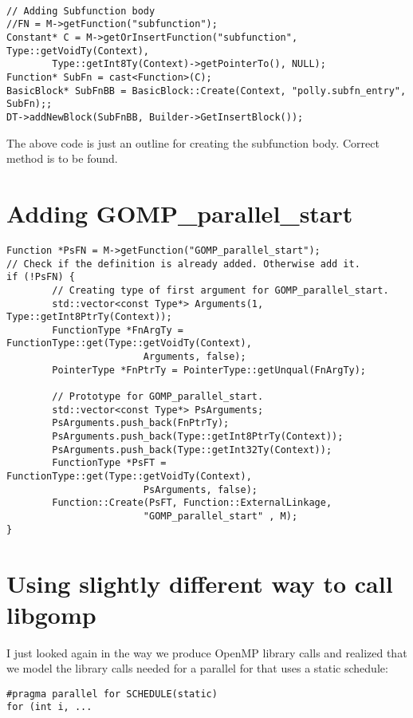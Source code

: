 \documentclass[a4paper,10pt]{article}
\begin{document}
\begin{verbatim}

// Adding Subfunction body
//FN = M->getFunction("subfunction");
Constant* C = M->getOrInsertFunction("subfunction", Type::getVoidTy(Context),
        Type::getInt8Ty(Context)->getPointerTo(), NULL);
Function* SubFn = cast<Function>(C);
BasicBlock* SubFnBB = BasicBlock::Create(Context, "polly.subfn_entry", SubFn);;
DT->addNewBlock(SubFnBB, Builder->GetInsertBlock());

\end{verbatim}

The above code is just an outline for creating the subfunction body. Correct method is to be found.

\section{Adding GOMP\_parallel\_start}

\begin{verbatim}
Function *PsFN = M->getFunction("GOMP_parallel_start");
// Check if the definition is already added. Otherwise add it.
if (!PsFN) {
        // Creating type of first argument for GOMP_parallel_start.
        std::vector<const Type*> Arguments(1, Type::getInt8PtrTy(Context));
        FunctionType *FnArgTy = FunctionType::get(Type::getVoidTy(Context),
                        Arguments, false);
        PointerType *FnPtrTy = PointerType::getUnqual(FnArgTy);

        // Prototype for GOMP_parallel_start.
        std::vector<const Type*> PsArguments;
        PsArguments.push_back(FnPtrTy);
        PsArguments.push_back(Type::getInt8PtrTy(Context));
        PsArguments.push_back(Type::getInt32Ty(Context));
        FunctionType *PsFT = FunctionType::get(Type::getVoidTy(Context),
                        PsArguments, false);
        Function::Create(PsFT, Function::ExternalLinkage,
                        "GOMP_parallel_start" , M);
}
\end{verbatim}

\section{Using slightly different way to call libgomp}

I just looked again in the way we produce OpenMP library calls and realized that we model the library calls needed for a parallel for
that uses a static schedule:

\begin{verbatim}
#pragma parallel for SCHEDULE(static)
for (int i, ...
\end{verbatim}                
\end{document}
